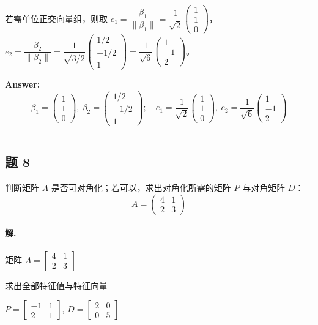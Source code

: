 \documentclass[12pt, a4paper]{article}
\newcommand{\problem}[1]{\subsection*{题 #1}}
\newcommand{\solution}{\paragraph{解.}}
\begin{document}
若需单位正交向量组，则取 $e_1=\dfrac{\beta_1}{\|\beta_1\|}=\dfrac{1}{\sqrt2}\begin{pmatrix}1\\1\\0\end{pmatrix}$，$e_2=\dfrac{\beta_2}{\|\beta_2\|}=\dfrac{1}{\sqrt{3/2}}\begin{pmatrix}1/2\\-1/2\\1\end{pmatrix}=\dfrac{1}{\sqrt6}\begin{pmatrix}1\\-1\\2\end{pmatrix}$。

\textbf{Answer:}
\[\boxed{\beta_1=\begin{pmatrix}1\\1\\0\end{pmatrix},\ \beta_2=\begin{pmatrix}1/2\\-1/2\\1\end{pmatrix};\quad e_1=\frac{1}{\sqrt2}\begin{pmatrix}1\\1\\0\end{pmatrix},\ e_2=\frac{1}{\sqrt6}\begin{pmatrix}1\\-1\\2\end{pmatrix}}\]

\vspace{1em}
\hrule
\vspace{1em}

\problem{8}

判断矩阵 $A$ 是否可对角化；若可以，求出对角化所需的矩阵 $P$ 与对角矩阵 $D$：
$$A = \begin{pmatrix} 4 & 1 \\ 2 & 3 \end{pmatrix}$$

\solution

矩阵 $A = \left[\begin{matrix}4 & 1\\2 & 3\end{matrix}\right]$

求出全部特征值与特征向量

$P = \left[\begin{matrix}-1 & 1\\2 & 1\end{matrix}\right]$, $D = \left[\begin{matrix}2 & 0\\0 & 5\end{matrix}\right]$
\end{document}
